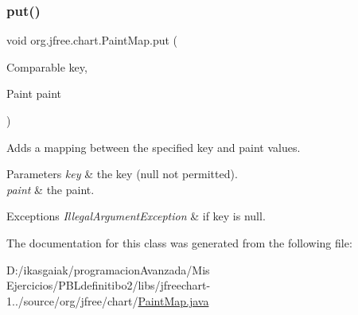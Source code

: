 \subsubsection{\texorpdfstring{put()}{put()}}
{\footnotesize\ttfamily void org.\+jfree.\+chart.\+Paint\+Map.\+put (\begin{DoxyParamCaption}\item[{Comparable}]{key,  }\item[{Paint}]{paint }\end{DoxyParamCaption})}

Adds a mapping between the specified {\ttfamily key} and {\ttfamily paint} values.


\begin{DoxyParams}{Parameters}
{\em key} & the key ({\ttfamily null} not permitted). \\
\hline
{\em paint} & the paint.\\
\hline
\end{DoxyParams}

\begin{DoxyExceptions}{Exceptions}
{\em Illegal\+Argument\+Exception} & if {\ttfamily key} is {\ttfamily null}. \\
\hline
\end{DoxyExceptions}


The documentation for this class was generated from the following file\+:\begin{DoxyCompactItemize}
\item 
D\+:/ikasgaiak/programacion\+Avanzada/\+Mis Ejercicios/\+P\+B\+Ldefinitibo2/libs/jfreechart-\/1../source/org/jfree/chart/\mbox{\hyperlink{_paint_map_8java}{Paint\+Map.\+java}}\end{DoxyCompactItemize}
